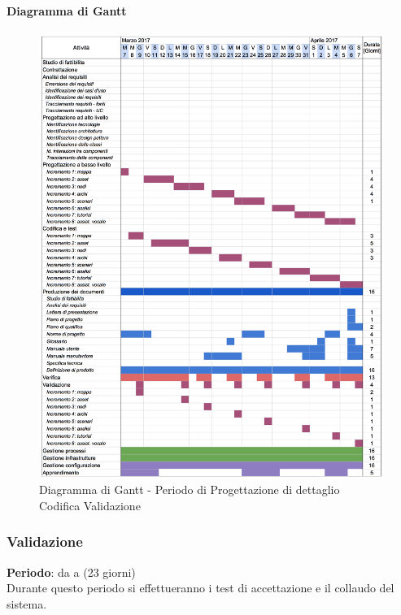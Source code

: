 		\paragraph{Diagramma di Gantt}
		\begin{figure}[H]
			\centering
			\includegraphics[width=\textwidth]{img/Gantt/g3c.png}
			\caption{Diagramma di Gantt - Periodo di Progettazione di dettaglio Codifica Validazione}
		\end{figure}
		
	\newpage
	\subsubsection {Validazione}
		\textbf{Periodo}: da  a  (23 giorni) \\
		Durante questo periodo si effettueranno i test di accettazione e il collaudo del sistema.
